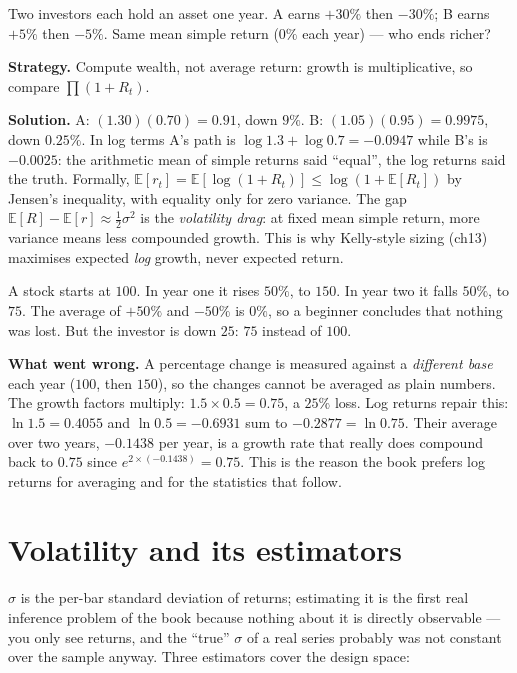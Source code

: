 \begin{example}\label{ex:drag}
Two investors each hold an asset one year. A earns $+30\%$ then
$-30\%$; B earns $+5\%$ then $-5\%$. Same mean simple return
($0\%$ each year) --- who ends richer?

\textbf{Strategy.} Compute wealth, not average return: growth is
multiplicative, so compare $\prod(1+R_t)$.

\textbf{Solution.} A: $(1.30)(0.70)=0.91$, down $9\%$. B:
$(1.05)(0.95)=0.9975$, down $0.25\%$. In log terms A's path is
$\log1.3+\log0.7 = -0.0947$ while B's is $-0.0025$: the arithmetic
mean of simple returns said ``equal'', the log returns said the truth.
Formally, $\mathbb E[r_t] = \mathbb E[\log(1+R_t)] \le
\log(1+\mathbb E[R_t])$ by Jensen's inequality, with equality only for
zero variance. The gap $\mathbb E[R]-\mathbb E[r]\approx
\tfrac12\sigma^2$ is the \emph{volatility drag}: at fixed mean simple
return, more variance means less compounded growth. This is why
Kelly-style sizing (ch13) maximises expected \emph{log} growth,
never expected return.
\end{example}

\begin{example}\label{ex:naive-avg-ret}
A stock starts at $100$. In year one it rises $50\%$, to $150$. In year two it falls
$50\%$, to $75$. The average of $+50\%$ and $-50\%$ is $0\%$, so a beginner concludes
that nothing was lost. But the investor is down $25$: $75$ instead of $100$.
\par\smallskip
\textbf{What went wrong.} A percentage change is measured against a \emph{different
base} each year ($100$, then $150$), so the changes cannot be averaged as plain numbers.
The growth factors multiply: $1.5\times0.5=0.75$, a $25\%$ loss. Log returns repair this:
$\ln1.5=0.4055$ and $\ln0.5=-0.6931$ sum to $-0.2877=\ln0.75$. Their average over two
years, $-0.1438$ per year, is a growth rate that really does compound back to $0.75$ since
$e^{2\times(-0.1438)}=0.75$. This is the reason the book prefers log returns for averaging
and for the statistics that follow.
\end{example}

\section{Volatility and its estimators}\label{sec:estimators}
$\sigma$ is the per-bar standard deviation of returns; estimating it
is the first real inference problem of the book because nothing about
it is directly observable --- you only see returns, and the
``true'' $\sigma$ of a real series probably was not constant over the
sample anyway. Three estimators cover the design space:

